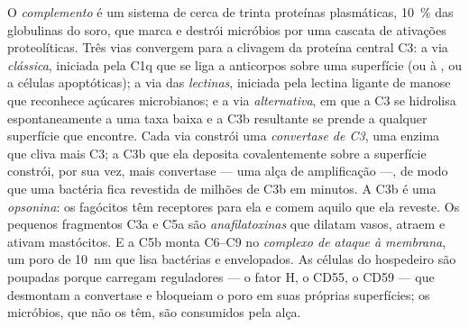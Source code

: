 \begin{definition}[Complemento]\label{def:b3:innate-immunity:complement}
O \emph{complemento} é um sistema de cerca de trinta proteínas
plasmáticas, \qty{10}{\%} das globulinas do soro, que marca e destrói
micróbios por uma cascata de ativações proteolíticas. Três vias
convergem para a clivagem da proteína central C3: a via \emph{clássica},
iniciada pela C1q que se liga a anticorpos sobre uma superfície (ou à
, ou a células apoptóticas); a via das
\emph{lectinas}, iniciada pela lectina ligante de manose que reconhece
açúcares microbianos; e a via \emph{alternativa}, em que a C3 se
hidrolisa espontaneamente a uma taxa baixa e a C3b resultante se prende
a qualquer superfície que encontre. Cada via constrói uma
\emph{convertase de C3}, uma enzima que cliva mais C3; a C3b que ela
deposita covalentemente sobre a superfície constrói, por sua vez, mais
convertase --- uma alça de amplificação ---, de modo que uma bactéria
fica revestida de milhões de C3b em minutos. A C3b é uma \emph{opsonina}:
os fagócitos têm receptores para ela e comem aquilo que ela reveste. Os
pequenos fragmentos C3a e C5a são \emph{anafilatoxinas} que dilatam
vasos, atraem  e ativam mastócitos. E a C5b monta C6--C9 no
\emph{complexo de ataque à membrana}, um poro de \qty{10}{nm} que lisa
bactérias  e  envelopados. As células do hospedeiro
são poupadas porque carregam reguladores --- o fator H, o CD55, o CD59
--- que desmontam a convertase e bloqueiam o poro em suas próprias
superfícies; os micróbios, que não os têm, são consumidos pela alça.
\end{definition}


